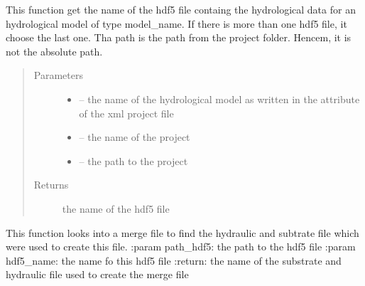 \documentclass[letterpaper,10pt,english]{sphinxmanual}
\begin{document}
\begin{fulllineitems}
\label{\detokenize{index:src.load_hdf5.get_hdf5_name}}
This function get the name of the hdf5 file containg the hydrological data for an hydrological model of type
model\_name. If there is more than one hdf5 file, it choose the last one. Tha path is the path from the
project folder. Hencem, it is not the absolute path.
\begin{quote}\begin{description}
\item[{Parameters}] \leavevmode\begin{itemize}
\item {} 
 -- the name of the hydrological model as written in the attribute of the xml project file

\item {} 
 -- the name of the project

\item {} 
 -- the path to the project

\end{itemize}

\item[{Returns}] \leavevmode
the name of the hdf5 file

\end{description}\end{quote}

\end{fulllineitems}


\begin{fulllineitems}
\label{\detokenize{index:src.load_hdf5.get_initial_files}}
This function looks into a merge file to find the hydraulic and subtrate file which
were used to create this file.
:param path\_hdf5: the path to the hdf5 file
:param hdf5\_name: the name fo this hdf5 file
:return: the name of the substrate and hydraulic file used to create the merge file

\end{fulllineitems}

\end{document}

